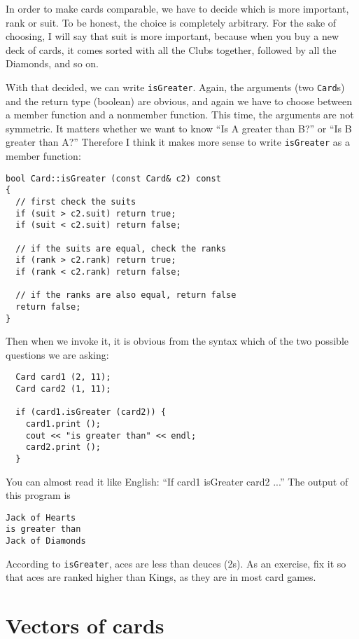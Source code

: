 
In order to make cards comparable, we have to decide which is more
important, rank or suit.  To be honest, the choice is completely
arbitrary.  For the sake of choosing, I will say that suit is more
important, because when you buy a new deck of cards, it comes sorted
with all the Clubs together, followed by all the Diamonds, and so on.

With that decided, we can write {\tt isGreater}.  Again, the arguments
(two {\tt Card}s) and the return type (boolean) are obvious, and again
we have to choose between a member function and a nonmember function.
This time, the arguments are not symmetric.  It matters whether we
want to know ``Is A greater than B?'' or ``Is B greater than A?''
Therefore I think it makes more sense to write {\tt isGreater} as a
member function:

\begin{lstlisting}
bool Card::isGreater (const Card& c2) const
{
  // first check the suits
  if (suit > c2.suit) return true;
  if (suit < c2.suit) return false;

  // if the suits are equal, check the ranks
  if (rank > c2.rank) return true;
  if (rank < c2.rank) return false;

  // if the ranks are also equal, return false
  return false;
}
\end{lstlisting}
%
Then when we invoke it, it is obvious from the syntax which
of the two possible questions we are asking:

\begin{lstlisting}
  Card card1 (2, 11);
  Card card2 (1, 11);

  if (card1.isGreater (card2)) {
    card1.print ();
    cout << "is greater than" << endl;
    card2.print ();
  }
\end{lstlisting}
%
You can almost read it like English: ``If card1 isGreater card2 ...''
The output of this program is

\begin{lstlisting}
Jack of Hearts
is greater than
Jack of Diamonds
\end{lstlisting}
%
According to {\tt isGreater}, aces are
less than deuces (2s).
As an exercise, fix it so that aces are ranked higher than Kings,
as they are in most card games.

\section{Vectors of cards}

